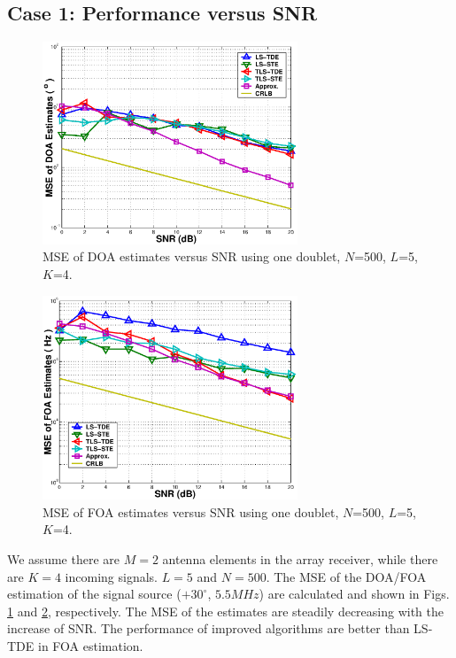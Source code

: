 \documentclass[conference]{IEEEtran}
\begin{document}
\subsection*{Case 1: Performance versus SNR}
\begin{figure}
\begin{center}
\includegraphics[width=3in]{SF_DOASNR.eps}
\caption{MSE of DOA estimates versus SNR using one doublet,
$N$=500, $L$=5, $K$=4.} \label{SF_DOASNR}
\end{center}
\end{figure}
\begin{figure}
\begin{center}
\includegraphics[width=3in]{SF_FOASNR.eps}
\caption{MSE of FOA estimates versus SNR using one doublet,
$N$=500, $L$=5, $K$=4.} \label{SF_FOASNR}
\end{center}
\end{figure}

We assume there are $M=2$ antenna elements in the array receiver,
while there are $K=4$ incoming signals. $L=5$ and $N=500$. The MSE
of the DOA/FOA estimation of the signal source ($+30^{\circ}$,
$5.5MHz$) are calculated and shown in Figs. \ref{SF_DOASNR} and
\ref{SF_FOASNR}, respectively. The MSE of the estimates are
steadily decreasing with the increase of SNR. The performance of
improved algorithms are better than LS-TDE in FOA estimation.
\end{document}
